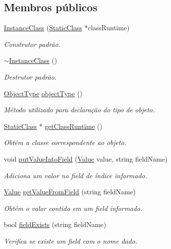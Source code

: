 \subsection*{Membros públicos}
\begin{DoxyCompactItemize}
\item 
\hyperlink{classInstanceClass_a86ab031eb0f0240b0a54423003000322}{Instance\+Class} (\hyperlink{classStaticClass}{Static\+Class} $\ast$class\+Runtime)
\begin{DoxyCompactList}\small\item\em Construtor padrão. \end{DoxyCompactList}\item 
\hyperlink{classInstanceClass_a441cc692dedc481373b7e670fab72556}{$\sim$\+Instance\+Class} ()
\begin{DoxyCompactList}\small\item\em Destrutor padrão. \end{DoxyCompactList}\item 
\hyperlink{BasicTypes_8h_a842c5e2e69277690b064bf363c017980}{Object\+Type} \hyperlink{classInstanceClass_ae8570307f49cb95cc01fb8d6bda23763}{object\+Type} ()
\begin{DoxyCompactList}\small\item\em Método utilizado para declaração do tipo de objeto. \end{DoxyCompactList}\item 
\hyperlink{classStaticClass}{Static\+Class} $\ast$ \hyperlink{classInstanceClass_adf2af3015bb8f777a3181d85aa279de8}{get\+Class\+Runtime} ()
\begin{DoxyCompactList}\small\item\em Obtém a classe correspondente ao objeto. \end{DoxyCompactList}\item 
void \hyperlink{classInstanceClass_af445c2e244c91b6cce4bb2c2798a720c}{put\+Value\+Into\+Field} (\hyperlink{structValue}{Value} value, string field\+Name)
\begin{DoxyCompactList}\small\item\em Adiciona um valor no field de índice informado. \end{DoxyCompactList}\item 
\hyperlink{structValue}{Value} \hyperlink{classInstanceClass_aee974c71919d470ea2e9aa75cf741a39}{get\+Value\+From\+Field} (string field\+Name)
\begin{DoxyCompactList}\small\item\em Obtém o valor contido em um field informado. \end{DoxyCompactList}\item 
bool \hyperlink{classInstanceClass_a284c7d0a062623c614a2f9440340070f}{field\+Exists} (string field\+Name)
\begin{DoxyCompactList}\small\item\em Verifica se existe um field com o nome dado. \end{DoxyCompactList}\end{DoxyCompactItemize}
